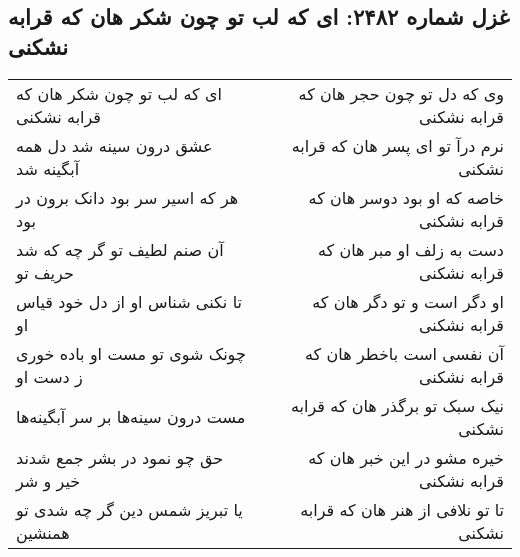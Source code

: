 \begin{center}
\section*{غزل شماره ۲۴۸۲: ای که لب تو چون شکر هان که قرابه نشکنی}
\label{sec:2482}
\begin{longtable}{l p{0.5cm} r}
ای که لب تو چون شکر هان که قرابه نشکنی
&&
وی که دل تو چون حجر هان که قرابه نشکنی
\\
عشق درون سینه شد دل همه آبگینه شد
&&
نرم درآ تو ای پسر هان که قرابه نشکنی
\\
هر که اسیر سر بود دانک برون در بود
&&
خاصه که او بود دوسر هان که قرابه نشکنی
\\
آن صنم لطیف تو گر چه که شد حریف تو
&&
دست به زلف او مبر هان که قرابه نشکنی
\\
تا نکنی شناس او از دل خود قیاس او
&&
او دگر است و تو دگر هان که قرابه نشکنی
\\
چونک شوی تو مست او باده خوری ز دست او
&&
آن نفسی است باخطر هان که قرابه نشکنی
\\
مست درون سینه‌ها بر سر آبگینه‌ها
&&
نیک سبک تو برگذر هان که قرابه نشکنی
\\
حق چو نمود در بشر جمع شدند خیر و شر
&&
خیره مشو در این خبر هان که قرابه نشکنی
\\
یا تبریز شمس دین گر چه شدی تو همنشین
&&
تا تو نلافی از هنر هان که قرابه نشکنی
\\
\end{longtable}
\end{center}
